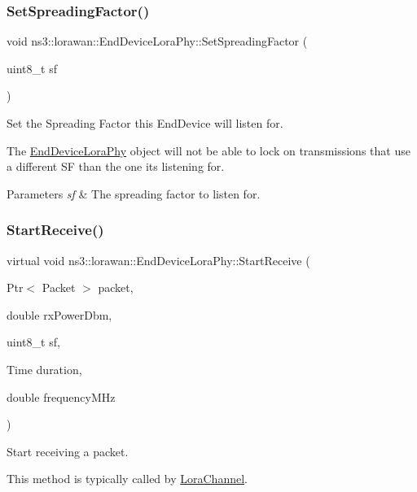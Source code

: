 \subsubsection{\texorpdfstring{Set\+Spreading\+Factor()}{SetSpreadingFactor()}}
{\footnotesize\ttfamily void ns3\+::lorawan\+::\+End\+Device\+Lora\+Phy\+::\+Set\+Spreading\+Factor (\begin{DoxyParamCaption}\item[{uint8\+\_\+t}]{sf }\end{DoxyParamCaption})}

Set the Spreading Factor this End\+Device will listen for.

The \hyperlink{classns3_1_1lorawan_1_1EndDeviceLoraPhy}{End\+Device\+Lora\+Phy} object will not be able to lock on transmissions that use a different SF than the one it\textquotesingle{}s listening for.


\begin{DoxyParams}{Parameters}
{\em sf} & The spreading factor to listen for. \\
\hline
\end{DoxyParams}
\mbox{\label{classns3_1_1lorawan_1_1EndDeviceLoraPhy_a93fbde8325d792a8fc287201482f89cb}} 
\subsubsection{\texorpdfstring{Start\+Receive()}{StartReceive()}}
{\footnotesize\ttfamily virtual void ns3\+::lorawan\+::\+End\+Device\+Lora\+Phy\+::\+Start\+Receive (\begin{DoxyParamCaption}\item[{Ptr$<$ Packet $>$}]{packet,  }\item[{double}]{rx\+Power\+Dbm,  }\item[{uint8\+\_\+t}]{sf,  }\item[{Time}]{duration,  }\item[{double}]{frequency\+M\+Hz }\end{DoxyParamCaption})\hspace{0.3cm}{\ttfamily [pure virtual]}}

Start receiving a packet.

This method is typically called by \hyperlink{classns3_1_1lorawan_1_1LoraChannel}{Lora\+Channel}.


